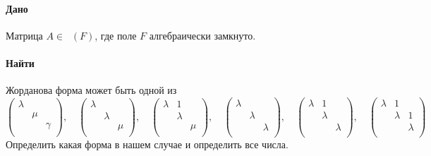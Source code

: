 \documentclass{article}
\newcommand{\Matrix}[2]{\mathop{\mathrm{M}_{#2}}(#1)}
\begin{document}
\paragraph{Дано} Матрица $A\in \Matrix{F}{3}$, где поле $F$ алгебраически замкнуто.

\paragraph{Найти} Жорданова форма может быть одной из
\[
\begin{pmatrix}
{\lambda}&{}&{}\\
{}&{\mu}&{}\\
{}&{}&{\gamma}\\
\end{pmatrix}
,\quad
\begin{pmatrix}
{\lambda}&{}&{}\\
{}&{\lambda}&{}\\
{}&{}&{\mu}\\
\end{pmatrix}
,\quad
\begin{pmatrix}
{\lambda}&{1}&{}\\
{}&{\lambda}&{}\\
{}&{}&{\mu}\\
\end{pmatrix}
,\quad
\begin{pmatrix}
{\lambda}&{}&{}\\
{}&{\lambda}&{}\\
{}&{}&{\lambda}\\
\end{pmatrix}
,\quad
\begin{pmatrix}
{\lambda}&{1}&{}\\
{}&{\lambda}&{}\\
{}&{}&{\lambda}\\
\end{pmatrix}
,\quad
\begin{pmatrix}
{\lambda}&{1}&{}\\
{}&{\lambda}&{1}\\
{}&{}&{\lambda}\\
\end{pmatrix}
\]
Определить какая форма в нашем случае и определить все числа.
\end{document}
